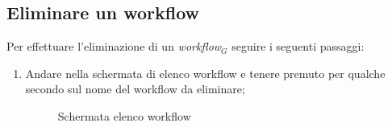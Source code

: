\subsection{Eliminare un workflow} \label{deleteWorkflow}
Per effettuare l'eliminazione di un \textit{workflow$_{G}$} seguire i seguenti passaggi:
\begin{enumerate}
	\item Andare nella schermata di elenco workflow e tenere premuto per qualche secondo sul nome del workflow da eliminare;
	\begin{figure}[!ht]
		\centering
		\caption{Schermata elenco workflow}
	\end{figure}

\end{enumerate}
